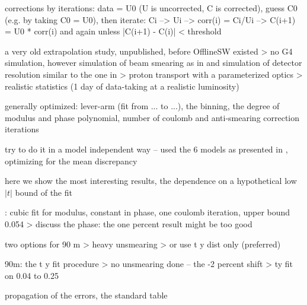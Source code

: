 \> corrections by iterations: data = U0 (U is uncorrected, C is corrected), guess C0 (e.g. by taking C0 = U0), then iterate:
Ci --> Ui --> corr(i) = Ci/Ui --> C(i+1) = U0 * corr(i) and again unless |C(i+1) - C(i)| < threshold

\> a very old extrapolation study, unpublished, before OfflineSW existed
\>> no G4 simulation, however simulation of beam smearing as in  and simulation of detector resolution similar to the one in 
\>> proton transport with a parameterized optics 
\>> realistic statistics (1 day of data-taking at a realistic luminosity)

\> generally optimized: lever-arm (fit from ... to ...), the binning, the degree of modulus and phase polynomial, number of coulomb and anti-smearing correction iterations

\> try to do it in a model independent way -- used the 6 models as presented in , optimizing for the mean discrepancy

\> here we show the most interesting results, the dependence on a hypothetical low $|t|$ bound of the fit

: cubic fit for modulus, constant in phase, one coulomb iteration, upper bound 0.054
\>> discuss the phase: the one percent result might be too good


\> two options for 90 m
\>> heavy unsmearing
\>> or use t y dist only (preferred)

\> 90m: the t y fit procedure
\>> no unsmearing done -- the -2 percent shift
\>> ty fit on 0.04 to 0.25

\> propagation of the errors, the standard table

